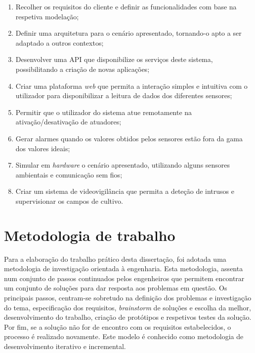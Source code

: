 \begin{enumerate}

	\item Recolher os requisitos do cliente e definir as funcionalidades com base na respetiva modelação; 
	
	\item Definir uma arquitetura para o cenário apresentado, tornando-o apto a ser adaptado a outros contextos; 
	
	\item Desenvolver uma \ac{API} que disponibilize os serviços deste sistema, possibilitando a criação de novas aplicações;   
	
	\item Criar uma plataforma \textit{web} que permita a  interação simples e intuitiva com o utilizador para disponibilizar a leitura de dados dos diferentes sensores; 
	
	\item Permitir que o utilizador do sistema atue remotamente na ativação/desativação de atuadores; 
	
	
	\item Gerar alarmes quando os valores obtidos pelos sensores estão fora da gama dos valores ideais; 
	
	\item Simular em \textit{hardware} o cenário apresentado, utilizando alguns sensores ambientais e comunicação sem fios; 
	
	\item Criar um sistema de videovigilância que permita a deteção de intrusos e supervisionar os campos de cultivo. 

\end{enumerate}










\section{Metodologia de trabalho}
\label{method}


Para a elaboração do trabalho prático desta dissertação, foi adotada uma metodologia de investigação orientada à engenharia\cite{desingprocess}. Esta metodologia, assenta num conjunto de passos continuados pelos engenheiros que permitem encontrar um conjunto de soluções para dar resposta aos problemas em questão. Os principais passos, centram-se sobretudo na definição dos problemas e investigação do tema, especificação dos requisitos, \textit{brainstorm} de soluções e escolha da melhor, desenvolvimento do trabalho, criação de protótipos e respetivos testes da solução. Por fim, se a solução não for de encontro com os requisitos estabelecidos, o processo é realizado novamente\cite{desingprocess}. Este modelo é conhecido como metodologia de desenvolvimento iterativo e incremental. 


